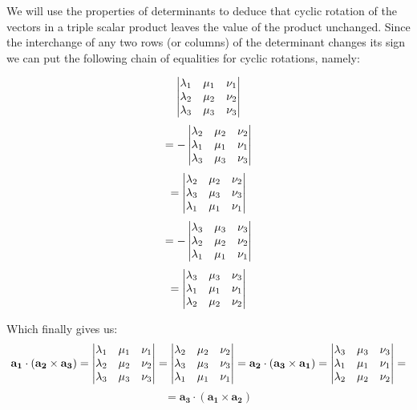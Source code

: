 \documentclass{article}
\begin{document}

We will use the properties of determinants to deduce that cyclic rotation of the vectors in a triple scalar product leaves the value of the
product unchanged. Since the interchange of any two rows (or columns) of the determinant changes its sign we can put the following
chain of equalities for cyclic rotations, namely:

\begin{equation*}
    \mdet{\lambda_1 & \mu_1 & \nu_1 \\ \lambda_2 & \mu_2 & \nu_2 \\ \lambda_3 & \mu_3 & \nu_3} 
\end{equation*}
\begin{equation*}
    = - \mdet{\lambda_2 & \mu_2 & \nu_2 \\ \lambda_1 & \mu_1 & \nu_1 \\ \lambda_3 & \mu_3 & \nu_3} 
\end{equation*}
\begin{equation*}
    = \mdet{\lambda_2 & \mu_2 & \nu_2 \\ \lambda_3 & \mu_3 & \nu_3 \\ \lambda_1 & \mu_1 & \nu_1} 
\end{equation*}
\begin{equation*}
    = - \mdet{\lambda_3 & \mu_3 & \nu_3 \\ \lambda_2 & \mu_2 & \nu_2 \\ \lambda_1 & \mu_1 & \nu_1} 
\end{equation*}
\begin{equation*}
    = \mdet{\lambda_3 & \mu_3 & \nu_3 \\ \lambda_1 & \mu_1 & \nu_1 \\ \lambda_2 & \mu_2 & \nu_2}
\end{equation*}

Which finally gives us:
\begin{equation*}
    \mathbf{a_1} \cdot (\mathbf{a_2} \times \mathbf{a_3}) = \mdet{\lambda_1 & \mu_1 & \nu_1 \\ \lambda_2 & \mu_2 & \nu_2 \\ \lambda_3 & \mu_3 & \nu_3} = \mdet{\lambda_2 & \mu_2 & \nu_2 \\ \lambda_3 & \mu_3 & \nu_3 \\ \lambda_1 & \mu_1 & \nu_1} = \mathbf{a_2} \cdot (\mathbf{a_3} \times \mathbf{a_1}) = \mdet{\lambda_3 & \mu_3 & \nu_3 \\ \lambda_1 & \mu_1 & \nu_1 \\ \lambda_2 & \mu_2 & \nu_2} = 
\end{equation*}
\begin{equation*}
    = \mathbf{a_3} \cdot (\mathbf{a_1} \times \mathbf{a_2})
\end{equation*}
\end{document}
